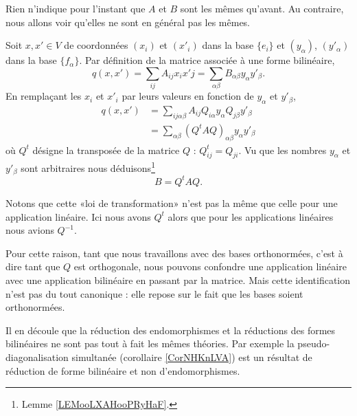 Rien n'indique pour l'instant que \( A\) et \( B\) sont les mêmes qu'avant. Au contraire, nous allons voir qu'elles ne sont en général pas les mêmes.

Soit \( x,x'\in V\) de coordonnées \( (x_i)\) et \( (x'_i)\) dans la base \( \{ e_i \}\) et \( (y_{\alpha})\), \( (y'_{\alpha})\) dans la base \( \{ f_{\alpha} \}\). Par définition de la matrice associée à une forme bilinéaire,
\begin{equation}
    q(x,x')=\sum_{ij}A_{ij}x_ix'j=\sum_{\alpha\beta}B_{\alpha\beta}y_{\alpha}y'_{\beta}.
\end{equation}
En remplaçant les \( x_i\) et \( x'_i\) par leurs valeurs en fonction de \( y_{\alpha}\) et \( y'_{\beta}\),
\begin{subequations}
    \begin{align}
        q(x,x')&=\sum_{ij\alpha\beta}A_{ij}Q_{i\alpha}y_{\alpha}Q_{j\beta}y'_{\beta}\\
        &=\sum_{\alpha\beta}(Q^tAQ)_{\alpha\beta}y_{\alpha}y'_{\beta}
    \end{align}
\end{subequations}
où \( Q^t\) désigne la transposée de la matrice \( Q\) :  \( Q^t_{ij}=Q_{ji}\). Vu que les nombres \( y_{\alpha}\) et \( y'_{\beta}\) sont arbitraires nous déduisons\footnote{Lemme \ref{LEMooLXAHooPRyHaF}.}
\begin{equation}        \label{EQooZUVTooKjqnJj}
    B=Q^tAQ.
\end{equation}

\begin{remark}
    Notons que cette «loi de transformation» n'est pas la même que celle pour une application linéaire. Ici nous avons \( Q^t\) alors que pour les applications linéaires nous avions \( Q^{-1}\).

    Pour cette raison, tant que nous travaillons avec des bases orthonormées, c'est à dire tant que \( Q\) est orthogonale, nous pouvons confondre une application linéaire avec une application bilinéaire en passant par la matrice. Mais cette identification n'est pas du tout canonique : elle repose sur le fait que les bases soient orthonormées.

    Il en découle que la réduction des endomorphismes et la réductions des formes bilinéaires ne sont pas tout à fait les mêmes théories. Par exemple la pseudo-diagonalisation simultanée (corollaire \ref{CorNHKnLVA}) est un résultat de réduction de forme bilinéaire et non d'endomorphismes.
\end{remark}

